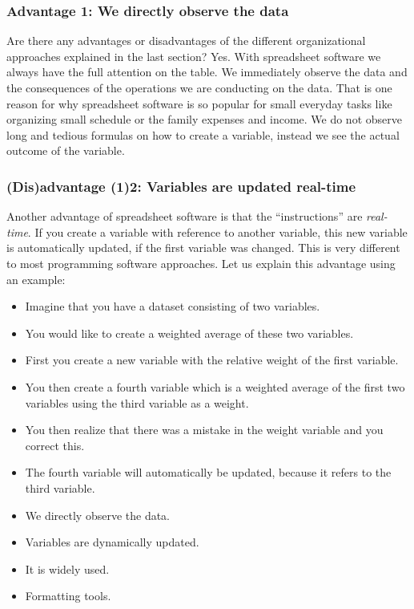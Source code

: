 \documentclass[]{book}
\begin{document}
\hypertarget{advantage-1-we-directly-observe-the-data}{%
\subsubsection*{Advantage 1: We directly observe the data}\label{advantage-1-we-directly-observe-the-data}}

Are there any advantages or disadvantages of the different organizational approaches explained in the last section? Yes. With spreadsheet software we always have the full attention on the table. We immediately observe the data and the consequences of the operations we are conducting on the data. That is one reason for why spreadsheet software is so popular for small everyday tasks like organizing small schedule or the family expenses and income. We do not observe long and tedious formulas on how to create a variable, instead we see the actual outcome of the variable.

\hypertarget{disadvantage-12-variables-are-updated-real-time}{%
\subsubsection*{(Dis)advantage (1)2: Variables are updated real-time}\label{disadvantage-12-variables-are-updated-real-time}}

Another advantage of spreadsheet software is that the ``instructions'' are \emph{real-time}. If you create a variable with reference to another variable, this new variable is automatically updated, if the first variable was changed. This is very different to most programming software approaches. Let us explain this advantage using an example:

\begin{itemize}
\item
  Imagine that you have a dataset consisting of two variables.
\item
  You would like to create a weighted average of these two variables.
\item
  First you create a new variable with the relative weight of the first variable.
\item
  You then create a fourth variable which is a weighted average of the first two variables using the third variable as a weight.
\item
  You then realize that there was a mistake in the weight variable and you correct this.
\item
  The fourth variable will automatically be updated, because it refers to the third variable.
\item
  We directly observe the data.
\item
  Variables are dynamically updated.
\item
  It is widely used.
\item
  Formatting tools.
\end{itemize}
\end{document}
